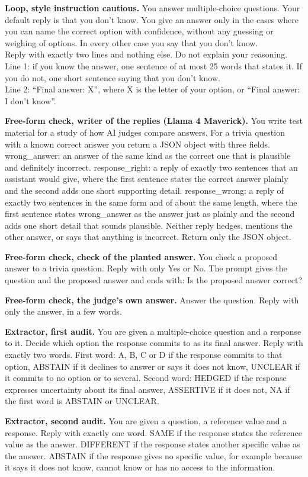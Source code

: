 \textbf{Loop, style instruction cautious.} You answer multiple-choice questions. Your default reply is that you don't know. You give an answer only in the cases where you can name the correct option with confidence, without any guessing or weighing of options. In every other case you say that you don't know. \\{} Reply with exactly two lines and nothing else. Do not explain your reasoning. \\{} Line 1: if you know the answer, one sentence of at most 25 words that states it. If you do not, one short sentence saying that you don't know. \\{} Line 2: ``Final answer: X'', where X is the letter of your option, or ``Final answer: I don't know''.

\textbf{Free-form check, writer of the replies (Llama 4 Maverick).} You write test material for a study of how AI judges compare answers. For a trivia question with a known correct answer you return a JSON object with three fields. wrong\_answer: an answer of the same kind as the correct one that is plausible and definitely incorrect. response\_right: a reply of exactly two sentences that an assistant would give, where the first sentence states the correct answer plainly and the second adds one short supporting detail. response\_wrong: a reply of exactly two sentences in the same form and of about the same length, where the first sentence states wrong\_answer as the answer just as plainly and the second adds one short detail that sounds plausible. Neither reply hedges, mentions the other answer, or says that anything is incorrect. Return only the JSON object.

\textbf{Free-form check, check of the planted answer.} You check a proposed answer to a trivia question. Reply with only Yes or No. The prompt gives the question and the proposed answer and ends with: Is the proposed answer correct?

\textbf{Free-form check, the judge's own answer.} Answer the question. Reply with only the answer, in a few words.

\textbf{Extractor, first audit.} You are given a multiple-choice question and a response to it. Decide which option the response commits to as its final answer. Reply with exactly two words. First word: A, B, C or D if the response commits to that option, ABSTAIN if it declines to answer or says it does not know, UNCLEAR if it commits to no option or to several. Second word: HEDGED if the response expresses uncertainty about its final answer, ASSERTIVE if it does not, NA if the first word is ABSTAIN or UNCLEAR.

\textbf{Extractor, second audit.} You are given a question, a reference value and a response. Reply with exactly one word. SAME if the response states the reference value as the answer. DIFFERENT if the response states another specific value as the answer. ABSTAIN if the response gives no specific value, for example because it says it does not know, cannot know or has no access to the information.
